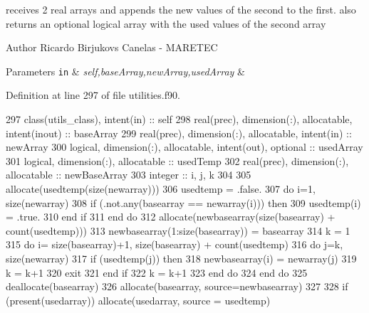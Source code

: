 receives 2 real arrays and appends the new values of the second to the first. also returns an optional logical array with the used values of the second array 

\begin{DoxyAuthor}{Author}
Ricardo Birjukovs Canelas -\/ M\+A\+R\+E\+T\+EC 
\end{DoxyAuthor}

\begin{DoxyParams}[1]{Parameters}
\mbox{\tt in}  & {\em self,base\+Array,new\+Array,used\+Array} & \\
\hline
\end{DoxyParams}


Definition at line 297 of file utilities.\+f90.


\begin{DoxyCode}
297     \textcolor{keywordtype}{class}(utils\_class), \textcolor{keywordtype}{intent(in)} :: self
298     \textcolor{keywordtype}{real(prec)}, \textcolor{keywordtype}{dimension(:)}, \textcolor{keywordtype}{allocatable}, \textcolor{keywordtype}{intent(inout)} :: baseArray
299     \textcolor{keywordtype}{real(prec)}, \textcolor{keywordtype}{dimension(:)}, \textcolor{keywordtype}{allocatable}, \textcolor{keywordtype}{intent(in)} :: newArray
300     \textcolor{keywordtype}{logical}, \textcolor{keywordtype}{dimension(:)}, \textcolor{keywordtype}{allocatable}, \textcolor{keywordtype}{intent(out)}, \textcolor{keywordtype}{optional} :: usedArray
301     \textcolor{keywordtype}{logical}, \textcolor{keywordtype}{dimension(:)}, \textcolor{keywordtype}{allocatable} :: usedTemp
302     \textcolor{keywordtype}{real(prec)}, \textcolor{keywordtype}{dimension(:)}, \textcolor{keywordtype}{allocatable} :: newBaseArray
303     \textcolor{keywordtype}{integer} :: i, j, k
304     
305     \textcolor{keyword}{allocate}(usedtemp(\textcolor{keyword}{size}(newarray)))
306     usedtemp = .false.
307     \textcolor{keywordflow}{do} i=1, \textcolor{keyword}{size}(newarray)
308         \textcolor{keywordflow}{if} (.not.any(basearray == newarray(i))) \textcolor{keywordflow}{then}
309             usedtemp(i) = .true.
310 \textcolor{keywordflow}{        end if}
311 \textcolor{keywordflow}{    end do}
312     \textcolor{keyword}{allocate}(newbasearray(\textcolor{keyword}{size}(basearray) + count(usedtemp)))
313     newbasearray(1:\textcolor{keyword}{size}(basearray)) = basearray
314     k = 1
315     \textcolor{keywordflow}{do} i= \textcolor{keyword}{size}(basearray)+1, \textcolor{keyword}{size}(basearray) + count(usedtemp)
316         \textcolor{keywordflow}{do} j=k, \textcolor{keyword}{size}(newarray)
317             \textcolor{keywordflow}{if} (usedtemp(j)) \textcolor{keywordflow}{then}
318                 newbasearray(i) =  newarray(j)
319                 k = k+1
320                 \textcolor{keywordflow}{exit}
321 \textcolor{keywordflow}{            end if} 
322             k = k+1
323 \textcolor{keywordflow}{        end do}        
324 \textcolor{keywordflow}{    end do}    
325     \textcolor{keyword}{deallocate}(basearray)
326     \textcolor{keyword}{allocate}(basearray, source=newbasearray)
327     
328     \textcolor{keywordflow}{if} (\textcolor{keyword}{present}(usedarray)) \textcolor{keyword}{allocate}(usedarray, source = usedtemp)    
\end{DoxyCode}

